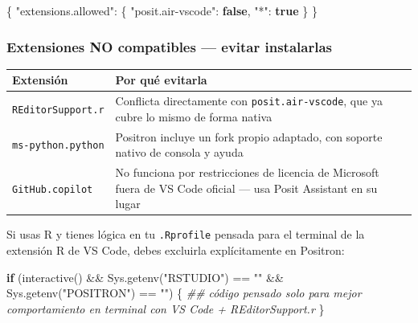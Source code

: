\documentclass[
  doc,
  floatsintext,
  longtable,
  a4paper,
  nolmodern,
  notxfonts,
  notimes,
  12pt,
  colorlinks=true,linkcolor=blue,citecolor=blue,urlcolor=blue]{apa7}
\newenvironment{Shaded}{\begin{snugshade}}{\end{snugshade}}
\newcommand{\ControlFlowTok}[1]{\textcolor[rgb]{0.00,0.23,0.31}{\textbf{#1}}}
\newcommand{\DataTypeTok}[1]{\textcolor[rgb]{0.68,0.00,0.00}{#1}}
\newcommand{\DocumentationTok}[1]{\textcolor[rgb]{0.37,0.37,0.37}{\textit{#1}}}
\newcommand{\FunctionTok}[1]{\textcolor[rgb]{0.28,0.35,0.67}{#1}}
\newcommand{\KeywordTok}[1]{\textcolor[rgb]{0.00,0.23,0.31}{\textbf{#1}}}
\newcommand{\NormalTok}[1]{\textcolor[rgb]{0.00,0.23,0.31}{#1}}
\newcommand{\SpecialCharTok}[1]{\textcolor[rgb]{0.37,0.37,0.37}{#1}}
\newcommand{\StringTok}[1]{\textcolor[rgb]{0.13,0.47,0.30}{#1}}
\newcounter{none} %
\begin{document}
\begin{Shaded}
\begin{Highlighting}[]
\FunctionTok{\{}
  \DataTypeTok{"extensions.allowed"}\FunctionTok{:} \FunctionTok{\{}
    \DataTypeTok{"posit.air{-}vscode"}\FunctionTok{:} \KeywordTok{false}\FunctionTok{,}
    \DataTypeTok{"*"}\FunctionTok{:} \KeywordTok{true}
  \FunctionTok{\}}
\FunctionTok{\}}
\end{Highlighting}
\end{Shaded}

\subsubsection{Extensiones NO compatibles --- evitar
instalarlas}\label{extensiones-no-compatibles-evitar-instalarlas}

{\def\LTcaptype{none} %
\begin{longtable}[]{@{}
  >{\raggedright\arraybackslash}p{}
  >{\raggedright\arraybackslash}p{}@{}}
\toprule\noalign{}
\begin{minipage}[b]{\linewidth}\raggedright
Extensión
\end{minipage} & \begin{minipage}[b]{\linewidth}\raggedright
Por qué evitarla
\end{minipage} \\
\midrule\noalign{}
\endhead
\bottomrule\noalign{}
\endlastfoot
\texttt{REditorSupport.r} & Conflicta directamente con
\texttt{posit.air-vscode}, que ya cubre lo mismo de forma nativa \\
\texttt{ms-python.python} & Positron incluye un fork propio adaptado,
con soporte nativo de consola y ayuda \\
\texttt{GitHub.copilot} & No funciona por restricciones de licencia de
Microsoft fuera de VS Code oficial --- usa Posit Assistant en su
lugar \\
\end{longtable}
}

Si usas R y tienes lógica en tu \texttt{.Rprofile} pensada para el
terminal de la extensión R de VS Code, debes excluirla explícitamente en
Positron:

\begin{Shaded}
\begin{Highlighting}[]
\ControlFlowTok{if}\NormalTok{ (}\FunctionTok{interactive}\NormalTok{() }\SpecialCharTok{\&\&} \FunctionTok{Sys.getenv}\NormalTok{(}\StringTok{"RSTUDIO"}\NormalTok{) }\SpecialCharTok{==} \StringTok{""} \SpecialCharTok{\&\&} \FunctionTok{Sys.getenv}\NormalTok{(}\StringTok{"POSITRON"}\NormalTok{) }\SpecialCharTok{==} \StringTok{""}\NormalTok{) \{}
  \DocumentationTok{\#\# código pensado solo para mejor comportamiento en terminal con VS Code + REditorSupport.r}
\NormalTok{\}}
\end{Highlighting}
\end{Shaded}
\end{document}
